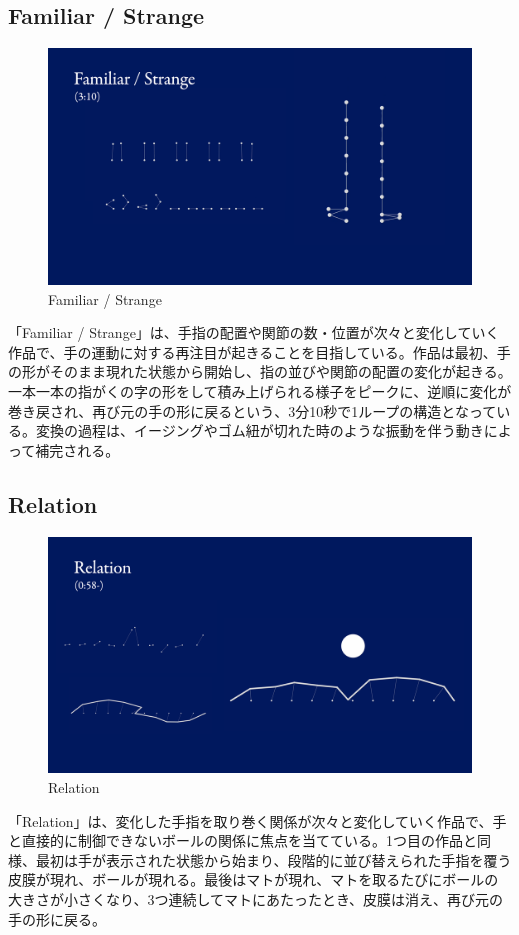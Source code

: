 \subsection*{Familiar / Strange}
\begin{figure}[H]
  \centering
  \includegraphics[width=15cm]{img/fs-02.png}
  \caption{Familiar / Strange}
  \label{fig:familiar_strange}
\end{figure}
「Familiar / Strange」は、手指の配置や関節の数・位置が次々と変化していく作品で、手の運動に対する再注目が起きることを目指している。作品は最初、手の形がそのまま現れた状態から開始し、指の並びや関節の配置の変化が起きる。一本一本の指がくの字の形をして積み上げられる様子をピークに、逆順に変化が巻き戻され、再び元の手の形に戻るという、3分10秒で1ループの構造となっている。変換の過程は、イージングやゴム紐が切れた時のような振動を伴う動きによって補完される。

\subsection*{Relation}
\begin{figure}[H]
  \centering
  \includegraphics[width=15cm]{img/relation.png}
  \caption{Relation}
  \label{fig:relation}
\end{figure}
「Relation」は、変化した手指を取り巻く関係が次々と変化していく作品で、手と直接的に制御できないボールの関係に焦点を当てている。1つ目の作品と同様、最初は手が表示された状態から始まり、段階的に並び替えられた手指を覆う皮膜が現れ、ボールが現れる。最後はマトが現れ、マトを取るたびにボールの大きさが小さくなり、3つ連続してマトにあたったとき、皮膜は消え、再び元の手の形に戻る。


